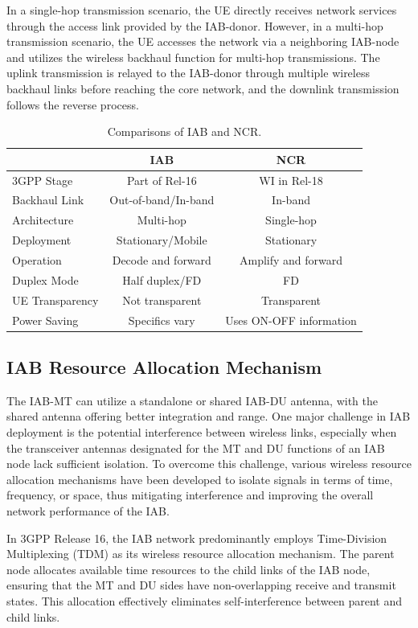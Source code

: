 \documentclass[lettersize,journal]{IEEEtran}
\begin{document}
In a single-hop transmission scenario, the UE directly receives network services through the access link provided by the IAB-donor. However, in a multi-hop transmission scenario, the UE accesses the network via a neighboring IAB-node and utilizes the wireless backhaul function for multi-hop transmissions. The uplink transmission is relayed to the IAB-donor through multiple wireless backhaul links before reaching the core network, and the downlink transmission follows the reverse process.


\begin{table}[!t]
\caption{Comparisons of IAB and NCR.}\label{tab:IAB_vs_NCR}
\centering
\begin{tabular}{|l|c|c|}
\hline
 & \textbf{IAB} & \textbf{NCR} \\
\hline
3GPP Stage & Part of Rel-16 & WI in Rel-18 \\
\hline
Backhaul Link & Out-of-band/In-band & In-band \\
\hline
Architecture & Multi-hop & Single-hop \\
\hline
Deployment & Stationary/Mobile & Stationary \\
\hline
Operation & Decode and forward & Amplify and forward \\
\hline
Duplex Mode & Half duplex/FD & FD \\
\hline
UE Transparency & Not transparent & Transparent \\
\hline
Power Saving & Specifics vary & Uses ON-OFF information \\
\hline
\end{tabular}
\end{table}

\subsection{IAB Resource Allocation Mechanism}

The IAB-MT can utilize a standalone or shared IAB-DU antenna, with the shared antenna offering better integration and range. One major challenge in IAB deployment is the potential interference between wireless links, especially when the transceiver antennas designated for the MT and DU functions of an IAB node lack sufficient isolation. To overcome this challenge, various wireless resource allocation mechanisms have been developed to isolate signals in terms of time, frequency, or space, thus mitigating interference and improving the overall network performance of the IAB.

In 3GPP Release 16, the IAB network predominantly employs Time-Division Multiplexing (TDM) as its wireless resource allocation mechanism. The parent node allocates available time resources to the child links of the IAB node, ensuring that the MT and DU sides have non-overlapping receive and transmit states. This allocation effectively eliminates self-interference between parent and child links.
\end{document}
